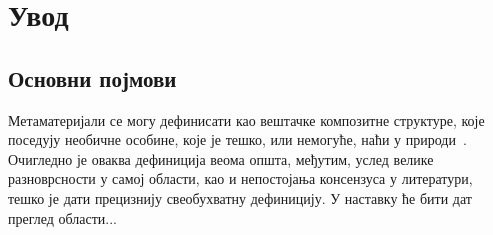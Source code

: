 










%

\chapter{Увод}


\section{Основни појмови}

Метаматеријали се могу дефинисати као вештачке композитне структуре, које поседују необичне особине, које је тешко, или немогуће, наћи у природи~\cite{Sham:09}. Очигледно је оваква дефиниција веома општа, међутим, услед велике разноврсности у самој области, као и непостојања консензуса у литератури, тешко је дати прецизнију свеобухватну дефиницију. У наставку ће бити дат преглед области...%

